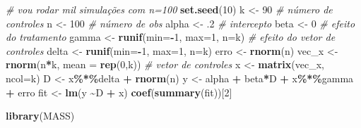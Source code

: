 \documentclass[
]{article}
\newenvironment{Shaded}{\begin{snugshade}}{\end{snugshade}}
\newcommand{\AttributeTok}[1]{\textcolor[rgb]{0.13,0.29,0.53}{#1}}
\newcommand{\CommentTok}[1]{\textcolor[rgb]{0.56,0.35,0.01}{\textit{#1}}}
\newcommand{\DecValTok}[1]{\textcolor[rgb]{0.00,0.00,0.81}{#1}}
\newcommand{\FunctionTok}[1]{\textcolor[rgb]{0.13,0.29,0.53}{\textbf{#1}}}
\newcommand{\NormalTok}[1]{#1}
\newcommand{\OtherTok}[1]{\textcolor[rgb]{0.56,0.35,0.01}{#1}}
\newcommand{\SpecialCharTok}[1]{\textcolor[rgb]{0.81,0.36,0.00}{\textbf{#1}}}
\begin{document}
\begin{Shaded}
\begin{Highlighting}[]
\CommentTok{\# vou rodar mil simulações com n=100}
\FunctionTok{set.seed}\NormalTok{(}\DecValTok{10}\NormalTok{)}
\NormalTok{k }\OtherTok{\textless{}{-}} \DecValTok{90} \CommentTok{\# número de controles}
\NormalTok{n }\OtherTok{\textless{}{-}} \DecValTok{100} \CommentTok{\# número de obs}
\NormalTok{alpha }\OtherTok{\textless{}{-}}\NormalTok{ .}\DecValTok{2} \CommentTok{\# intercepto}
\NormalTok{beta }\OtherTok{\textless{}{-}} \DecValTok{0} \CommentTok{\# efeito do tratamento}
\NormalTok{gamma }\OtherTok{\textless{}{-}} \FunctionTok{runif}\NormalTok{(}\AttributeTok{min=}\SpecialCharTok{{-}}\DecValTok{1}\NormalTok{, }\AttributeTok{max=}\DecValTok{1}\NormalTok{, }\AttributeTok{n=}\NormalTok{k) }\CommentTok{\# efeito do vetor de controles}
\NormalTok{delta }\OtherTok{\textless{}{-}} \FunctionTok{runif}\NormalTok{(}\AttributeTok{min=}\SpecialCharTok{{-}}\DecValTok{1}\NormalTok{, }\AttributeTok{max=}\DecValTok{1}\NormalTok{, }\AttributeTok{n=}\NormalTok{k) }
\NormalTok{erro }\OtherTok{\textless{}{-}} \FunctionTok{rnorm}\NormalTok{(n)}
\NormalTok{vec\_x }\OtherTok{\textless{}{-}} \FunctionTok{rnorm}\NormalTok{(n}\SpecialCharTok{*}\NormalTok{k, }\AttributeTok{mean =} \FunctionTok{rep}\NormalTok{(}\DecValTok{0}\NormalTok{,k)) }\CommentTok{\# vetor de controles}
\NormalTok{x }\OtherTok{\textless{}{-}} \FunctionTok{matrix}\NormalTok{(vec\_x, }\AttributeTok{ncol=}\NormalTok{k)}
\NormalTok{D }\OtherTok{\textless{}{-}}\NormalTok{ x}\SpecialCharTok{\%*\%}\NormalTok{delta }\SpecialCharTok{+} \FunctionTok{rnorm}\NormalTok{(n)}
\NormalTok{y }\OtherTok{\textless{}{-}}\NormalTok{ alpha }\SpecialCharTok{+}\NormalTok{ beta}\SpecialCharTok{*}\NormalTok{D }\SpecialCharTok{+}\NormalTok{ x}\SpecialCharTok{\%*\%}\NormalTok{gamma }\SpecialCharTok{+}\NormalTok{ erro}
\NormalTok{fit }\OtherTok{\textless{}{-}} \FunctionTok{lm}\NormalTok{(y }\SpecialCharTok{\textasciitilde{}}\NormalTok{D }\SpecialCharTok{+}\NormalTok{ x)}
\FunctionTok{coef}\NormalTok{(}\FunctionTok{summary}\NormalTok{(fit))[}\DecValTok{2}\NormalTok{]}
\end{Highlighting}
\end{Shaded}

\begin{Shaded}
\begin{Highlighting}[]
\FunctionTok{library}\NormalTok{(MASS)}
\end{Highlighting}
\end{Shaded}
\end{document}
